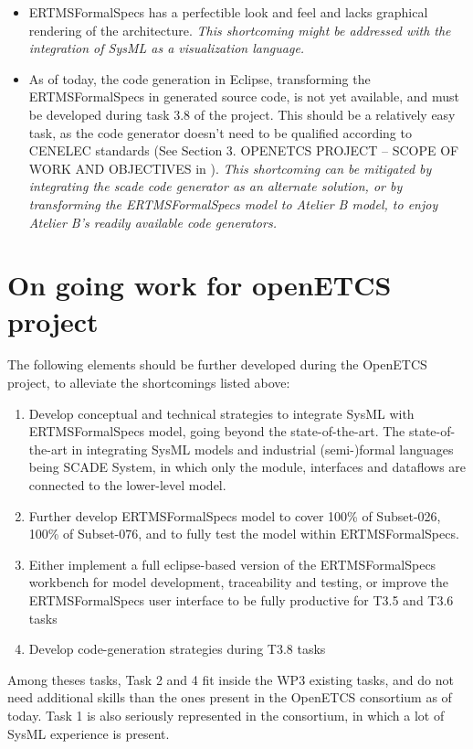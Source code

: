 \begin{itemize}
	\item ERTMSFormalSpecs has a perfectible look and feel and lacks graphical rendering of the architecture. \emph{This shortcoming might be addressed with the integration of SysML as a visualization language.}
	\item As of today, the code generation in Eclipse, transforming the ERTMSFormalSpecs in generated source code, is not yet available, and must be developed during task 3.8 of the project. This should be a relatively easy task, as the code generator doesn't need to be qualified according to CENELEC standards (See Section 3. OPENETCS PROJECT – SCOPE OF WORK AND OBJECTIVES in \citep{WP3_WP4_WP7_SafetyMeetingMinutes_April2013}). \emph{This shortcoming can be mitigated by integrating the scade code generator as an alternate solution, or by transforming the ERTMSFormalSpecs model to Atelier B model, to enjoy Atelier B's readily available code generators.}
\end{itemize}

\section{On going work for openETCS project}

The following elements should be further developed during the OpenETCS project, to alleviate the shortcomings listed above:

\begin{enumerate}
  \item Develop conceptual and technical strategies to integrate SysML with ERTMSFormalSpecs model, going beyond the state-of-the-art. The state-of-the-art in integrating SysML models and industrial (semi-)formal languages being SCADE System, in which only the module, interfaces and dataflows are connected to the lower-level model.
	\item Further develop ERTMSFormalSpecs model to cover 100\% of Subset-026, 100\% of Subset-076, and to fully test the model within ERTMSFormalSpecs. 
	\item Either implement a full eclipse-based version of the ERTMSFormalSpecs workbench for model development, traceability and testing, or improve the ERTMSFormalSpecs user interface to be fully productive for T3.5 and T3.6 tasks
	\item Develop code-generation strategies during T3.8 tasks
\end{enumerate}

Among theses tasks, Task 2 and 4 fit inside the WP3 existing tasks, and do not need additional skills than the ones present in the OpenETCS consortium as of today. Task 1 is also seriously represented in the consortium, in which a lot of SysML experience is present. 

